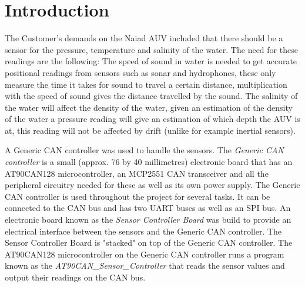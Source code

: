 
\section{Introduction}\label{sec:introduction}
The Customer's demands on the Naiad AUV included that there should be a sensor for the pressure, temperature and salinity of the water. The need for these readings are the following: \newline
The speed of sound in water is needed to get accurate positional readings from sensors such as sonar and hydrophones, these only measure the time it takes for sound to travel a certain distance, multiplication with the speed of sound gives the distance travelled by the sound. \newline
The salinity of the water will affect the density of the water, given an estimation of the density of the water a pressure reading will give an estimation of which depth the AUV is at, this reading will not be affected by drift (unlike for example inertial sensors).

A Generic CAN controller was used to handle the sensors. The \emph{Generic CAN controller} is a small (approx. 76 by 40 millimetres) electronic board that has an AT90CAN128 microcontroller, an MCP2551 CAN transceiver and all the peripheral circuitry needed for these as well as its own power supply. The Generic CAN controller is used throughout the project for several tasks. It can be connected to the CAN bus and has two UART buses as well as an SPI bus. \newline
An electronic board known as the \emph{Sensor Controller Board} was build to provide an electrical interface between the sensors and the Generic CAN controller. The Sensor Controller Board is "stacked" on top of the Generic CAN controller. \newline
The AT90CAN128 microcontroller on the Generic CAN controller runs a program known as the \emph{AT90CAN\_Sensor\_Controller} that reads the sensor values and output their readings on the CAN bus.


